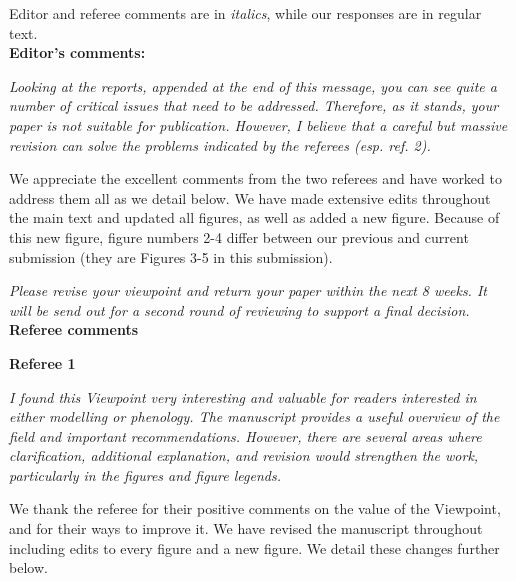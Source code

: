 \documentclass[11pt]{article}
\begin{document}
Editor and referee comments are in \emph{italics}, while our responses are in regular text. \\ 

{\bf Editor's comments:} 


\emph{Looking at the reports, appended at the end of this message, you can see quite a number of critical issues that
need to be addressed. Therefore, as it stands, your paper is not suitable for publication. However, I believe
that a careful but massive revision can solve the problems indicated by the referees (esp. ref. 2).}

We appreciate the excellent comments from the two referees and have worked to address them all as we detail below. We have made extensive edits throughout the main text and updated all figures, as well as added a new figure. Because of this new figure, figure numbers 2-4 differ between our previous and current submission (they are Figures 3-5 in this submission). 

\emph{Please revise your viewpoint and return your paper within the next 8 weeks. It will be send out for a second
round of reviewing to support a final decision.}\\

{\bf Referee comments}

{\bf Referee 1} 

\emph{I found this Viewpoint very interesting and valuable for readers interested in either modelling or phenology. The
manuscript provides a useful overview of the field and important recommendations. However, there are several
areas where clarification, additional explanation, and revision would strengthen the work, particularly in the
figures and figure legends.}

We thank the referee for their positive comments on the value of the Viewpoint, and for their ways to improve it. We have revised the manuscript throughout including edits to every figure and a new figure. We detail these changes further below. 
\end{document}
